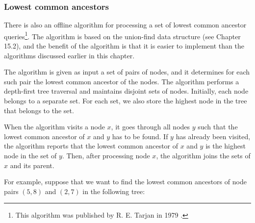 \subsubsection{Lowest common ancestors}

There is also an offline algorithm
for processing a set of
lowest common ancestor queries\footnote{This
algorithm was published by R. E. Tarjan in 1979 \cite{tar79}.}.
The algorithm is based on the union-find data structure
(see Chapter 15.2), and the benefit of the algorithm is
that it is easier to implement than the
algorithms discussed earlier in this chapter.

The algorithm is given as input a set of pairs of nodes,
and it determines for each such pair the
lowest common ancestor of the nodes.
The algorithm performs a depth-first tree traversal
and maintains disjoint sets of nodes.
Initially, each node belongs to a separate set.
For each set, we also store the highest node in the
tree that belongs to the set.

When the algorithm visits a node $x$,
it goes through all nodes $y$ such that
the lowest common ancestor of $x$ and $y$
has to be found.
If $y$ has already been visited,
the algorithm reports that the 
lowest common ancestor of $x$ and $y$
is the highest node in the set of $y$.
Then, after processing node $x$,
the algorithm joins the sets of $x$ and its parent.

For example, suppose that we want to find the lowest
common ancestors of node pairs $(5,8)$
and $(2,7)$ in the following tree:
\begin{center}
\end{center}

